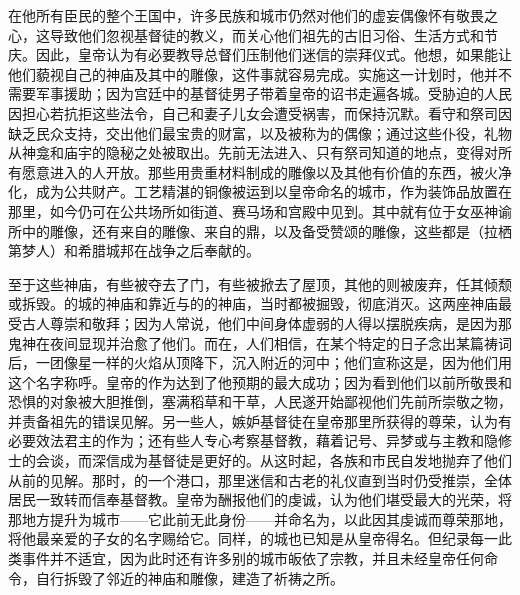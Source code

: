 在他所有臣民的整个王国中，许多民族和城市仍然对他们的虚妄偶像怀有敬畏之心，这导致他们忽视基督徒的教义，而关心他们祖先的古旧习俗、生活方式和节庆。因此，皇帝认为有必要教导总督们压制他们迷信的崇拜仪式。他想，如果能让他们藐视自己的神庙及其中的雕像，这件事就容易完成。实施这一计划时，他并不需要军事援助；因为宫廷中的基督徒男子带着皇帝的诏书走遍各城。受胁迫的人民因担心若抗拒这些法令，自己和妻子儿女会遭受祸害，而保持沉默。看守和祭司因缺乏民众支持，交出他们最宝贵的财富，以及被称为的偶像；通过这些仆役，礼物从神龛和庙宇的隐秘之处被取出。先前无法进入、只有祭司知道的地点，变得对所有愿意进入的人开放。那些用贵重材料制成的雕像以及其他有价值的东西，被火净化，成为公共财产。工艺精湛的铜像被运到以皇帝命名的城市，作为装饰品放置在那里，如今仍可在公共场所如街道、赛马场和宫殿中见到。其中就有位于女巫神谕所中的雕像，还有来自的雕像、来自的鼎，以及备受赞颂的雕像，这些都是（拉栖第梦人）和希腊城邦在战争之后奉献的。\par

至于这些神庙，有些被夺去了门，有些被掀去了屋顶，其他的则被废弃，任其倾颓或拆毁。的城的神庙和靠近与的的神庙，当时都被掘毁，彻底消灭。这两座神庙最受古人尊崇和敬拜；因为人常说，他们中间身体虚弱的人得以摆脱疾病，是因为那鬼神在夜间显现并治愈了他们。而在，人们相信，在某个特定的日子念出某篇祷词后，一团像星一样的火焰从顶降下，沉入附近的河中；他们宣称这是，因为他们用这个名字称呼。皇帝的作为达到了他预期的最大成功；因为看到他们以前所敬畏和恐惧的对象被大胆推倒，塞满稻草和干草，人民遂开始鄙视他们先前所崇敬之物，并责备祖先的错误见解。另一些人，嫉妒基督徒在皇帝那里所获得的尊荣，认为有必要效法君主的作为；还有些人专心考察基督教，藉着记号、异梦或与主教和隐修士的会谈，而深信成为基督徒是更好的。从这时起，各族和市民自发地抛弃了他们从前的见解。那时，的一个港口，那里迷信和古老的礼仪直到当时仍受推崇，全体居民一致转而信奉基督教。皇帝为酬报他们的虔诚，认为他们堪受最大的光荣，将那地方提升为城市——它此前无此身份——并命名为，以此因其虔诚而尊荣那地，将他最亲爱的子女的名字赐给它。同样，的城也已知是从皇帝得名。但纪录每一此类事件并不适宜，因为此时还有许多别的城市皈依了宗教，并且未经皇帝任何命令，自行拆毁了邻近的神庙和雕像，建造了祈祷之所。\par

